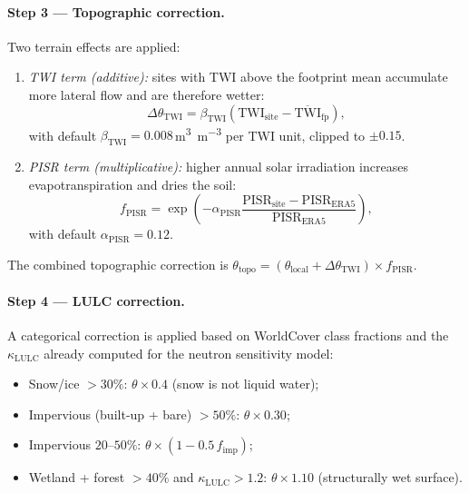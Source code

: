 \paragraph{Step 3 — Topographic correction.}
Two terrain effects are applied:
\begin{enumerate}[nosep]
  \item \emph{TWI term (additive):}
        sites with TWI above the footprint mean accumulate more lateral
        flow and are therefore wetter:
        \begin{equation}
          \Delta\theta_\mathrm{TWI}
            = \beta_\mathrm{TWI}
              \left(\mathrm{TWI}_\mathrm{site} - \overline{\mathrm{TWI}}_\mathrm{fp}\right),
          \label{eq:delta_twi}
        \end{equation}
        with default $\beta_\mathrm{TWI} = 0.008$\,\si{\cubic\metre\per\cubic\metre}
        per TWI unit, clipped to $\pm0.15$.
  \item \emph{PISR term (multiplicative):}
        higher annual solar irradiation increases evapotranspiration
        and dries the soil:
        \begin{equation}
          f_\mathrm{PISR}
            = \exp\!\left(-\alpha_\mathrm{PISR}
              \frac{\mathrm{PISR}_\mathrm{site} - \mathrm{PISR}_\mathrm{ERA5}}
                   {\mathrm{PISR}_\mathrm{ERA5}}\right),
          \label{eq:f_pisr}
        \end{equation}
        with default $\alpha_\mathrm{PISR} = 0.12$.
\end{enumerate}
The combined topographic correction is
$\theta_\mathrm{topo} = (\theta_\mathrm{local} + \Delta\theta_\mathrm{TWI})
 \times f_\mathrm{PISR}$.

\paragraph{Step 4 — LULC correction.}
A categorical correction is applied based on WorldCover class fractions
and the $\kappa_\mathrm{LULC}$ already computed for the neutron sensitivity
model:
\begin{itemize}[nosep]
  \item Snow/ice $> 30\%$: $\theta \times 0.4$ (snow is not liquid water);
  \item Impervious (built-up + bare) $> 50\%$: $\theta \times 0.30$;
  \item Impervious $20$--$50\%$: $\theta \times (1 - 0.5\,f_\mathrm{imp})$;
  \item Wetland + forest $> 40\%$ and $\kappa_\mathrm{LULC} > 1.2$:
        $\theta \times 1.10$ (structurally wet surface).
\end{itemize}

